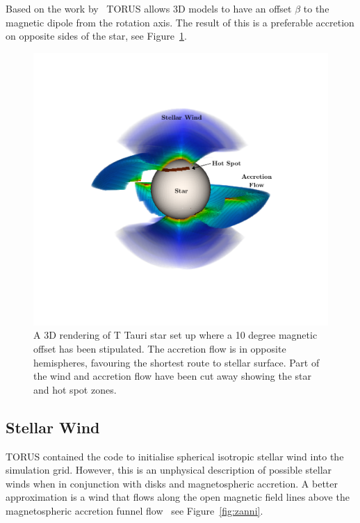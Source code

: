 \documentclass[fleqn,usenatbib]{mnras}
\begin{document}
Based on the work by~\citet{Mahdavi:1998fw} TORUS allows 3D models to have an offset $\beta$ to the magnetic dipole from the rotation axis. The result of this is a preferable accretion on opposite sides of the star, see Figure~\ref{fig:3Doffset}.
\begin{figure}
    \centering
    \includegraphics[width=\linewidth,trim={2cm 1cm 2cm 1cm},clip]{figures/3Doffset}
    \caption{A 3D rendering of T Tauri star set up where a 10 degree magnetic offset has been stipulated. The accretion flow is in opposite hemispheres, favouring the shortest route to stellar surface. Part of the wind and accretion flow have been cut away showing the star and hot spot zones.}
    \label{fig:3Doffset}
\end{figure}

\subsection{Stellar Wind}
\label{sec:wind}
TORUS contained the code to initialise spherical isotropic stellar wind into the simulation grid. However, this is an unphysical description of possible stellar winds when in conjunction with disks and magnetospheric accretion. A better approximation is a wind that flows along the open magnetic field lines above the magnetospheric accretion funnel flow~\citep[e.g.][]{2009A&A...508.1117Z,2012MNRAS.426.2901K} see Figure~\ref{fig:zanni}.
\end{document}

